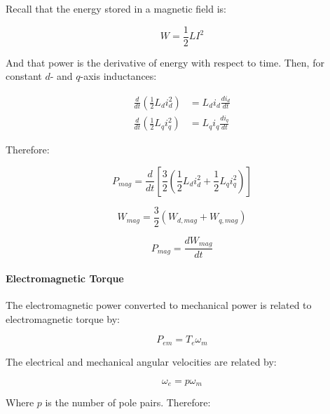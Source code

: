 \documentclass{article}
\begin{document}
Recall that the energy stored in a magnetic field is:

\begin{equation}
    W = \frac{1}{2}LI^2
\end{equation}

And that power is the derivative of energy with respect to time. Then, for constant $d$- and $q$-axis inductances:

\begin{align}
\frac{d}{dt}
\left(
\frac{1}{2}L_d i_d^2
\right)
&=
L_d i_d\frac{di_d}{dt}
\\[6pt]
\frac{d}{dt}
\left(
\frac{1}{2}L_q i_q^2
\right)
&=
L_q i_q\frac{di_q}{dt}
\end{align}

Therefore:

\begin{equation}
    P_{mag} = \frac{d}{dt}
    \left[
    \frac{3}{2} \left(
    \frac{1}{2}L_d i_d^2 + \frac{1}{2}L_q i_q^2
    \right)
    \right]
\end{equation}

\begin{equation}
    W_{mag} = \frac{3}{2}(W_{d,mag} + W_{q,mag})
\end{equation}

\begin{equation}
    P_{mag} = \frac{dW_{mag}}{dt}
\end{equation}


\paragraph{Electromagnetic Torque}
\label{sec:electromagnetic-torque}

The electromagnetic power converted to mechanical power is related to electromagnetic torque by:

\begin{equation}
    P_{em} = T_e\omega_m
\end{equation}

The electrical and mechanical angular velocities are related by:

\begin{equation}
    \omega_e = p\omega_m
\end{equation}

Where $p$ is the number of pole pairs. Therefore:
\end{document}
